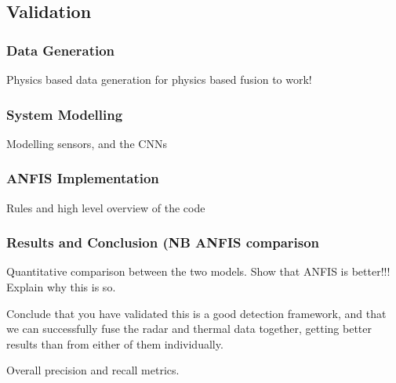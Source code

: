 \subsection{Validation} \label{compvis_anfisvalid}

    \subsubsection{Data Generation}
    
        Physics based data generation for physics based fusion to work!
        
    \subsubsection{System Modelling}
    
        Modelling sensors, and the CNNs
    
    \subsubsection{ANFIS Implementation}
        
        Rules and high level overview of the code
    
    \subsubsection{Results and Conclusion (NB ANFIS comparison}
    
        Quantitative comparison between the two models. Show that ANFIS is better!!! Explain why this is so.
        
        Conclude that you have validated this is a good detection framework, and that we can successfully fuse the radar and thermal data together, getting better results than from either of them individually.
        
        Overall precision and recall metrics.
    